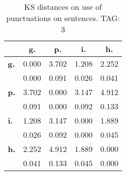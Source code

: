 \begin{table}[h!]
\begin{center}
\begin{tabular}{| l || c | c | c | c |}\hline
 & {\bf g.} & {\bf p.} & {\bf i.} & {\bf h.} \\\hline\hline
{\bf g.} & 0.000 & 3.702 & 1.208 & 2.252 \\
{\bf } & 0.000 & 0.091 & 0.026 & 0.041 \\\hline
{\bf p.} & 3.702 & 0.000 & 3.147 & 4.912 \\
{\bf } & 0.091 & 0.000 & 0.092 & 0.133 \\\hline
{\bf i.} & 1.208 & 3.147 & 0.000 & 1.889 \\
{\bf } & 0.026 & 0.092 & 0.000 & 0.045 \\\hline
{\bf h.} & 2.252 & 4.912 & 1.889 & 0.000 \\
{\bf } & 0.041 & 0.133 & 0.045 & 0.000 \\\hline
\end{tabular}
\caption{KS distances on use of punctuations on sentences. TAG: 3}
\end{center}
\end{table}